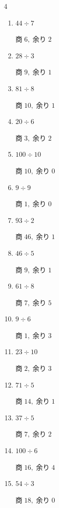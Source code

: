 \begin{multicols}{4}
\begin{enumerate}
  \item $44 \div 7$

        $商\; 6,\; 余り\; 2$

  \item $28 \div 3$

        $商\; 9,\; 余り\; 1$

  \item $81 \div 8$

        $商\; 10,\; 余り\; 1$

\columnbreak %

  \item $20 \div 6$

        $商\; 3,\; 余り\; 2$

  \item $100 \div 10$

        $商\; 10,\; 余り\; 0$

  \item $9 \div 9$

        $商\; 1,\; 余り\; 0$

  \item $93 \div 2$

        $商\; 46,\; 余り\; 1$

  \item $46 \div 5$

        $商\; 9,\; 余り\; 1$

  \item $61 \div 8$

        $商\; 7,\; 余り\; 5$

  \item $9 \div 6$

        $商\; 1,\; 余り\; 3$

  \item $23 \div 10$

        $商\; 2,\; 余り\; 3$

  \item $71 \div 5$

        $商\; 14,\; 余り\; 1$

  \item $37 \div 5$

        $商\; 7,\; 余り\; 2$

  \item $100 \div 6$

        $商\; 16,\; 余り\; 4$

  \item $54 \div 3$

        $商\; 18,\; 余り\; 0$


\end{enumerate}
\end{multicols}
